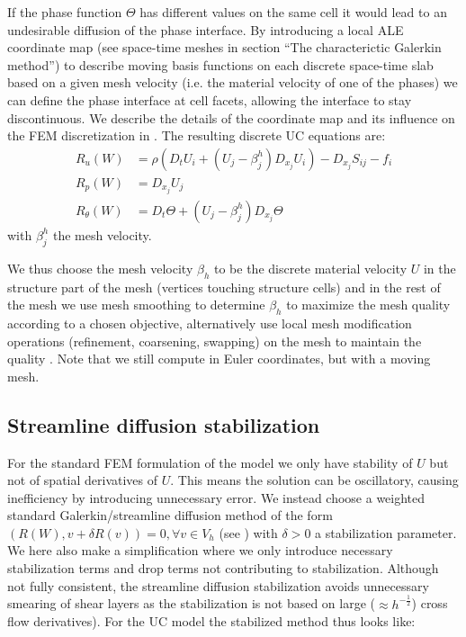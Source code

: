 If the phase function $\Theta$ has different values on the same cell
it would lead to an undesirable diffusion of the phase interface. By
introducing a local ALE coordinate
map \cite{ErikssonEstepHansboEtAl1996} (see space-time meshes in
section ``The characterictic Galerkin method'') to describe moving
basis functions on each discrete space-time slab based on a given mesh
velocity (i.e. the material velocity of one of the phases) we can
define the phase interface at cell facets, allowing the interface to
stay discontinuous. We describe the details of the coordinate map and
its influence on the FEM discretization
in \cite{HoffmanJanssonLoggEtAl2009}. The resulting discrete UC
equations are:
\begin{equation}
\begin{split}\label{eq:ALE}
R_u(W) &= \rho(D_t U_i + (U_j - \beta^h_j) D_{x_j} U_i) - D_{x_j} S_{ij} - f_i\\
R_p(W) &= D_{x_j} U_j\\
R_\theta(W) &= D_t \Theta + (U_j - \beta^h_j) D_{x_j} \Theta
\end{split}
\end{equation}
with $\beta^h_j$ the mesh velocity.

We thus choose the mesh velocity $\beta_h$ to be the discrete material
velocity $U$ in the structure part of the mesh (vertices touching
structure cells) and in the rest of the mesh we use mesh smoothing to
determine $\beta_h$ to maximize the mesh quality according to a chosen
objective, alternatively use local mesh modification operations
(refinement, coarsening, swapping) on the mesh to maintain the quality
\cite{Comp`ereRemacleJanssonEtAl2009}. Note that we still compute in Euler
coordinates, but with a moving mesh.

\subsection{Streamline diffusion stabilization}

For the standard FEM formulation of the model we only have stability
of $U$ but not of spatial derivatives of $U$. This means the solution
can be oscillatory, causing inefficiency by introducing unnecessary
error. We instead choose a weighted standard Galerkin/streamline
diffusion method of the form $(R(W), v + \delta R(v)) = 0, \forall v
\in V_h$ (see \cite{ErikssonEstepHansboEtAl1996}) with $\delta > 0$ a stabilization
parameter. We here also make a simplification where we only introduce
necessary stabilization terms and drop terms not contributing to
stabilization. Although not fully consistent, the streamline diffusion
stabilization avoids unnecessary smearing of shear layers as the
stabilization is not based on large ($\approx h^{-\frac{1}{2}}$) cross flow
derivatives). For the UC model the stabilized method thus looks like:

